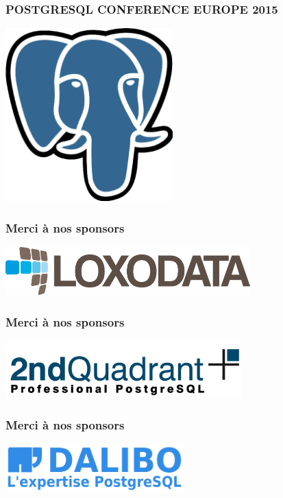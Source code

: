 \documentclass{beamer}
\begin{document}
\begin{frame}[fragile]
  \frametitle{POSTGRESQL CONFERENCE EUROPE 2015}

  
  \begin{center}
    \includegraphics[height=18em]{postgres-logo.eps}
  \end{center}
\end{frame}

\begin{frame}[fragile]
  \frametitle{Merci à nos sponsors}

  \begin{center}
    \includegraphics[height=5em]{loxologo.png}
  \end{center}
\end{frame}

\begin{frame}[fragile]
  \frametitle{Merci à nos sponsors}

  \begin{center}
    \includegraphics[height=6em]{2ndquadrant_logo_full_color.jpg}
  \end{center}
\end{frame}

\begin{frame}[fragile]
  \frametitle{Merci à nos sponsors}

  \begin{center}
    \includegraphics[height=5em]{logo_dalibo_large_blue.png}
  \end{center}
\end{frame}
\end{document}
